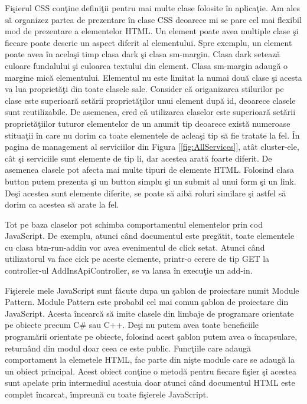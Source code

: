 \documentclass[a4paper,12pt]{report}
\let\oldref\ref
\renewcommand{\ref}[1]{[\oldref{#1}]}
\begin{document}
Fi\c sierul CSS con\c tine defini\c tii pentru mai multe clase folosite \^in aplica\c tie. Am ales s\u a organizez 
partea de prezentare \^in clase CSS deoarece mi se pare cel mai flexibil mod de prezentare a elementelor HTML.
Un element poate avea multiple clase \c si fiecare poate descrie un aspect diferit al elementului.
Spre exemplu, un element poate avea \^in acela\c si timp clasa dark \c si clasa sm-margin. Clasa dark seteaz\u a culoare fundalului \c si culoarea
textului din element. Clasa sm-margin adaug\u a o margine mic\u a elementului. Elementul nu este limitat la numai dou\u a clase \c si 
acesta va lua propriet\u a\c ti din toate clasele sale. Consider c\u a origanizarea stilurilor pe clase este superioar\u a
set\u arii propriet\u a\c tilor unui element dup\u a id, deoarece clasele sunt reutilizabile. De asemenea, 
cred c\u a utilizarea claselor este superioar\u a set\u arii propriet\u a\c tiilor tuturor elementelor de un anumit 
tip deoarece exist\u a numeroase stitua\c tii \^in care nu dorim ca toate elementele de aclea\c si tip s\u a fie tratate la fel.
\^In pagina de management al serviciilor din Figura \ref{fig:AllServices}, at\^at cluster-ele, c\^at \c si 
serviciile sunt elemente de tip li, dar acestea arat\u a foarte diferit.  De asemenea clasele pot afecta 
mai multe tipuri de elemente HTML. Folosind clasa button putem prezenta \c si un button simplu \c si un submit 
al unui form \c si un link. De\c si acestea sunt elemente diferite, se poate s\u a aib\u a roluri similare
\c si astfel s\u a dorim ca acestea s\u a arate la fel.

Tot pe baza claselor pot schimba comportamentul elementelor prin cod JavaScript. De exemplu,
atunci c\^and documentul este preg\u atit, toate elementele cu clasa btn-run-addin vor avea 
evenimentul de click setat. Atunci c\^and utilizatorul va face cick pe aceste elemente, printr-o cerere 
de tip GET la controller-ul AddInsApiController, se va lansa \^in execu\c tie un add-in.

Fi\c sierele mele JavaScript sunt f\u acute dupa un \c sablon de proiectare numit Module Pattern. Module Pattern 
este probabil cel mai comun \c sablon de proiectare din  JavaScript. Acesta \^incearc\u a s\u a imite clasele din limbaje de programare 
orientate pe obiecte precum C\# sau C++. De\c si nu putem avea toate beneficiile program\u arii orientate pe obiecte, 
folosind acest \c sablon putem avea o \^incapsulare, return\^and din modul doar ceea ce este public.
Func\c tiile care adaug\u a comportament la elemetele HTML, fac parte din ni\c ste module care 
se adaug\u a la un obiect principal. Acest obiect con\c tine o metod\u a pentru fiecare fi\c sier 
\c si acestea sunt apelate prin intermediul acestuia doar atunci c\^and documentul HTML este complet \^incarcat, \^impreun\u a cu
toate fi\c sierele JavaScript.
\end{document}
